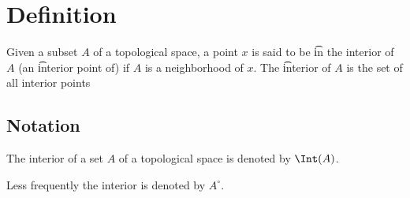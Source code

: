 
\section*{Definition}

Given a subset $A$ of a topological space, a point $x$ is said to be \t{in the interior of} $A$ (an \t{interior point of}) if $A$ is a neighborhood of $x$.
The \t{interior} of $A$ is the set of all interior points

\subsection*{Notation}

The interior of a set $A$ of a topological space is denoted by $\Int(A)$.

Less frequently the interior is denoted by $A^\circ$.

\blankpage